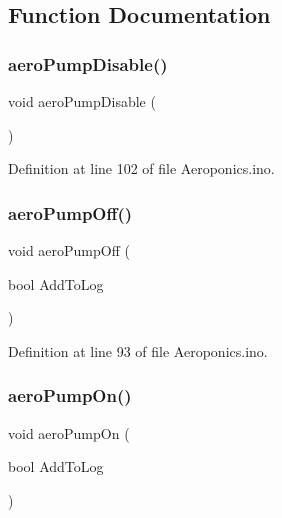 \subsection{Function Documentation}
\mbox{\label{_aeroponics_8ino_a6dafc1be1d72b5c0533b7815b3b1b923}} 
\subsubsection{\texorpdfstring{aeroPumpDisable()}{aeroPumpDisable()}}
{\footnotesize\ttfamily void aero\+Pump\+Disable (\begin{DoxyParamCaption}{ }\end{DoxyParamCaption})}



Definition at line 102 of file Aeroponics.\+ino.

\mbox{\label{_aeroponics_8ino_ac9ad9d76d41d75ac2874ccee33e08a62}} 
\subsubsection{\texorpdfstring{aeroPumpOff()}{aeroPumpOff()}}
{\footnotesize\ttfamily void aero\+Pump\+Off (\begin{DoxyParamCaption}\item[{bool}]{Add\+To\+Log }\end{DoxyParamCaption})}



Definition at line 93 of file Aeroponics.\+ino.

\mbox{\label{_aeroponics_8ino_af4cfefde32e6a62145a0b74f678f658b}} 
\subsubsection{\texorpdfstring{aeroPumpOn()}{aeroPumpOn()}}
{\footnotesize\ttfamily void aero\+Pump\+On (\begin{DoxyParamCaption}\item[{bool}]{Add\+To\+Log }\end{DoxyParamCaption})}



